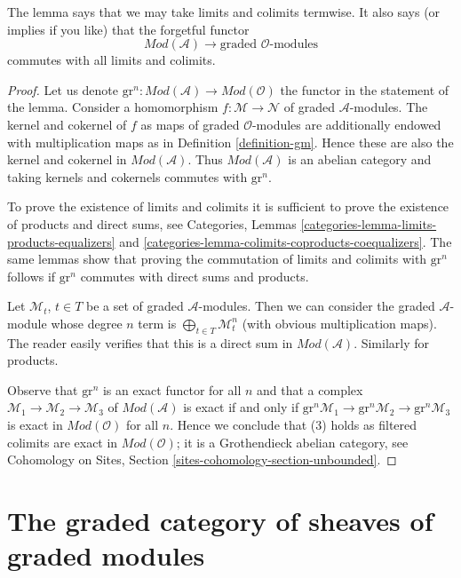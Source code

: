 \documentclass{stacks-project}
\theoremstyle{plain}
\theoremstyle{definition}
\theoremstyle{remark}
\numberwithin{equation}{subsection}
\begin{document}
\noindent
The lemma says that we may take limits and colimits termwise. It
also says (or implies if you like) that the forgetful functor
$$
\textit{Mod}(\mathcal{A})
\longrightarrow
\text{graded }\mathcal{O}\text{-modules}
$$
commutes with all limits and colimits.

\begin{proof}
Let us denote
$\text{gr}^n : \textit{Mod}(\mathcal{A}) \to \textit{Mod}(\mathcal{O})$
the functor in the statement of the lemma.
Consider a homomorphism $f : \mathcal{M} \to \mathcal{N}$
of graded $\mathcal{A}$-modules. The kernel
and cokernel of $f$ as maps of graded $\mathcal{O}$-modules
are additionally endowed with multiplication maps as in
Definition \ref{definition-gm}. Hence these are also
the kernel and cokernel in $\textit{Mod}(\mathcal{A})$.
Thus $\textit{Mod}(\mathcal{A})$ is an abelian category
and taking kernels and cokernels commutes with $\text{gr}^n$.

\medskip\noindent
To prove the existence of limits and colimits it is sufficient
to prove the existence of products and direct sums, see
Categories, Lemmas \ref{categories-lemma-limits-products-equalizers} and
\ref{categories-lemma-colimits-coproducts-coequalizers}.
The same lemmas show that
proving the commutation of limits and colimits with $\text{gr}^n$
follows if $\text{gr}^n$ commutes with direct sums and products.

\medskip\noindent
Let $\mathcal{M}_t$, $t \in T$ be a set of graded $\mathcal{A}$-modules.
Then we can consider the graded $\mathcal{A}$-module whose degree $n$
term is $\bigoplus_{t \in T} \mathcal{M}_t^n$ (with obvious multiplication
maps). The reader easily verifies that this is a direct sum in
$\textit{Mod}(\mathcal{A})$. Similarly for products.

\medskip\noindent
Observe that $\text{gr}^n$ is an exact functor for all $n$ and that
a complex $\mathcal{M}_1 \to \mathcal{M}_2 \to \mathcal{M}_3$
of $\textit{Mod}(\mathcal{A})$ is exact if and only if
$\text{gr}^n\mathcal{M}_1 \to \text{gr}^n\mathcal{M}_2 \to
\text{gr}^n\mathcal{M}_3$ is exact in $\textit{Mod}(\mathcal{O})$
for all $n$. Hence we conclude that (3) holds as filtered
colimits are exact in $\textit{Mod}(\mathcal{O})$;
it is a Grothendieck abelian category, see
Cohomology on Sites, Section \ref{sites-cohomology-section-unbounded}.
\end{proof}






\section{The graded category of sheaves of graded modules}
\label{section-gm-gr-cat}
\end{document}
